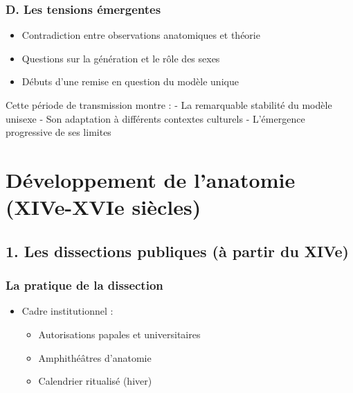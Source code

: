\documentclass[
  letterpaper,
  DIV=11,
  numbers=noendperiod]{scrreprt}
\providecommand{\tightlist}{%
  \setlength{\itemsep}{0pt}\setlength{\parskip}{0pt}}\usepackage{longtable,booktabs,array}
\begin{document}
\subsection{D. Les tensions
émergentes}\label{d.-les-tensions-uxe9mergentes}

\begin{itemize}
\tightlist
\item
  Contradiction entre observations anatomiques et théorie
\item
  Questions sur la génération et le rôle des sexes
\item
  Débuts d'une remise en question du modèle unique
\end{itemize}

Cette période de transmission montre : - La remarquable stabilité du
modèle unisexe - Son adaptation à différents contextes culturels -
L'émergence progressive de ses limites

\subsection{}\label{section-3}


\chapter{Développement de l'anatomie (XIVe-XVIe
siècles)}\label{duxe9veloppement-de-lanatomie-xive-xvie-siuxe8cles}

\section{1. Les dissections publiques (à partir du
XIVe)}\label{les-dissections-publiques-uxe0-partir-du-xive}

\subsection{La pratique de la
dissection}\label{la-pratique-de-la-dissection}

\begin{itemize}
\tightlist
\item
  Cadre institutionnel :

  \begin{itemize}
  \tightlist
  \item
    Autorisations papales et universitaires
  \item
    Amphithéâtres d'anatomie
  \item
    Calendrier ritualisé (hiver)
  \end{itemize}
\end{itemize}
\end{document}
